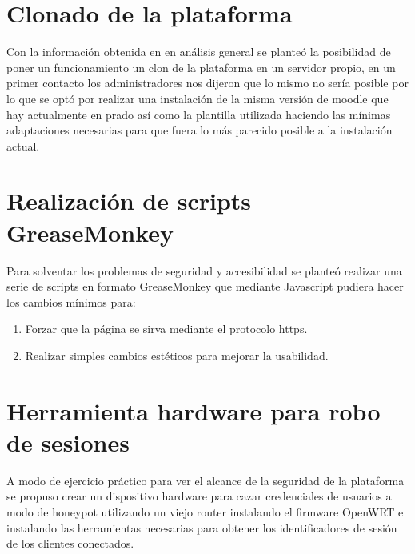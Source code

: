 \section{Clonado de la plataforma}

Con la información obtenida en en análisis general se planteó la posibilidad de poner un funcionamiento un clon de la plataforma en un servidor propio, en un primer contacto los administradores nos dijeron que lo mismo no sería posible por lo que se optó por realizar una instalación de la misma versión de moodle que hay actualmente en prado así como la plantilla utilizada haciendo las mínimas adaptaciones necesarias para que fuera lo más parecido posible a la instalación actual.

\section{Realización de scripts GreaseMonkey}

Para solventar los problemas de seguridad y accesibilidad se planteó realizar una serie de scripts en formato GreaseMonkey que mediante Javascript pudiera hacer los cambios mínimos para:

  		\begin{enumerate}
  			\item Forzar que la página se sirva mediante el protocolo https.
            \item Realizar simples cambios estéticos para mejorar la usabilidad.
        \end{enumerate}

\section{Herramienta hardware para robo de sesiones}

A modo de ejercicio práctico para ver el alcance de la seguridad de la plataforma se propuso crear un dispositivo hardware para cazar credenciales de usuarios a modo de honeypot utilizando un viejo router instalando el firmware OpenWRT \cite{openwrt} e instalando las herramientas necesarias para obtener los identificadores de sesión de los clientes conectados.



